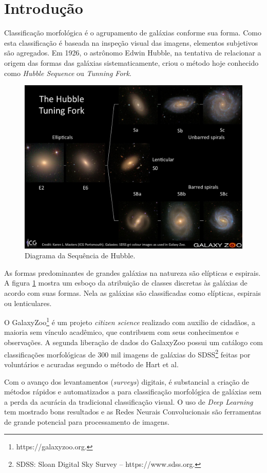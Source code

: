 \section*{Introdução}

Classificação morfológica é o agrupamento de galáxias conforme sua forma. Como esta classificação é baseada na inspeção visual das imagens, elementos subjetivos são agregados. Em 1926, o astrônomo Edwin Hubble, na tentativa de relacionar a origem das formas das galáxias sistematicamente, criou o método hoje conhecido como \emph{Hubble Sequence} ou \emph{Tunning Fork}. \cite{hubble1926, fortson2012}

\begin{figure}[h!]
    \centering
    \includegraphics[width=.8\textwidth]{figures/tuningfork1.jpg}
    \caption{Diagrama da Sequência de Hubble.}
    \label{fig:tuningfork}
\end{figure}

As formas predominantes de grandes galáxias na natureza são elípticas e espirais. A figura \ref{fig:tuningfork} mostra um esboço da atribuição de classes discretas às galáxias de acordo com suas formas. Nela as galáxias são classificadas como elípticas, espirais ou lenticulares. \cite{fortson2012}

O GalaxyZoo\footnote{https://galaxyzoo.org.} é um projeto \emph{citizen science} realizado com auxilio de cidadãos, a maioria sem vínculo acadêmico, que contribuem com seus conhecimentos e observações. A segunda liberação de dados do GalaxyZoo possui um catálogo com classificações morfológicas de 300 mil imagens de galáxias do SDSS\footnote{SDSS: Sloan Digital Sky Survey -- https://www.sdss.org.} feitas por voluntários e acuradas segundo o método de Hart et al. \cite{hart2016}

Com o avanço dos levantamentos (\emph{surveys}) digitais, é substancial a criação de métodos rápidos e automatizados a para classificação morfológica de galáxias sem a perda da acurácia da tradicional classificação visual. \cite{yamauchi2005} O uso de \emph{Deep Learning} tem mostrado bons resultados e as Redes Neurais Convolucionais são ferramentas de grande potencial para processamento de imagens. \cite{barchi2020, dai2018}

